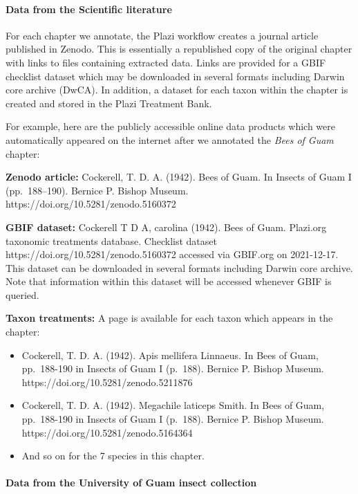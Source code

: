 \documentclass[
]{article}
\begin{document}
\hypertarget{data-from-the-scientific-literature}{%
\paragraph{Data from the Scientific
literature}\label{data-from-the-scientific-literature}}

For each chapter we annotate, the Plazi workflow creates a journal
article published in Zenodo. This is essentially a republished copy of
the original chapter with links to files containing extracted data.
Links are provided for a GBIF checklist dataset which may be downloaded
in several formats including Darwin core archive (DwCA). In addition, a
dataset for each taxon within the chapter is created and stored in the
Plazi Treatment Bank.

For example, here are the publicly accessible online data products which
were automatically appeared on the internet after we annotated the
\emph{Bees of Guam} chapter:

\textbf{Zenodo article:} Cockerell, T. D. A. (1942). Bees of Guam. In
Insects of Guam I (pp.~188--190). Bernice P. Bishop Museum.
https://doi.org/10.5281/zenodo.5160372

\textbf{GBIF dataset:} Cockerell T D A, carolina (1942). Bees of Guam.
Plazi.org taxonomic treatments database. Checklist dataset
https://doi.org/10.5281/zenodo.5160372 accessed via GBIF.org on
2021-12-17. This dataset can be downloaded in several formats including
Darwin core archive. Note that information within this dataset will be
accessed whenever GBIF is queried.

\textbf{Taxon treatments:} A page is available for each taxon which
appears in the chapter:

\begin{itemize}
\item
  Cockerell, T. D. A. (1942). Apis mellifera Linnaeus. In Bees of Guam,
  pp.~188-190 in Insects of Guam I (p.~188). Bernice P. Bishop Museum.
  https://doi.org/10.5281/zenodo.5211876
\item
  Cockerell, T. D. A. (1942). Megachile laticeps Smith. In Bees of Guam,
  pp.~188-190 in Insects of Guam I (p.~188). Bernice P. Bishop Museum.
  https://doi.org/10.5281/zenodo.5164364
\item
  And so on for the 7 species in this chapter.
\end{itemize}

\hypertarget{data-from-the-university-of-guam-insect-collection}{%
\paragraph{Data from the University of Guam insect
collection}\label{data-from-the-university-of-guam-insect-collection}}
\end{document}
